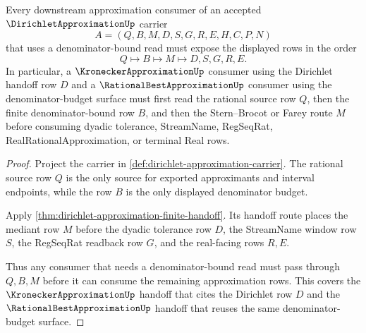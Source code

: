 \begin{theorem}
\label{thm:dirichlet-approximation-denominator-window}
Every downstream approximation consumer of an accepted $\DirichletApproximationUp$ carrier
$$
A=(Q,B,M,D,S,G,R,E,H,C,P,N)
$$
that uses a denominator-bound read must expose the displayed rows in the order
$$
Q \longmapsto B \longmapsto M \longmapsto D,S,G,R,E .
$$
In particular, a $\KroneckerApproximationUp$ consumer using the Dirichlet handoff row $D$ and a $\RationalBestApproximationUp$ consumer using the denominator-budget surface must first read the rational source row $Q$, then the finite denominator-bound row $B$, and then the Stern--Brocot or Farey route $M$ before consuming dyadic tolerance, StreamName, RegSeqRat, RealRationalApproximation, or terminal Real rows.
\end{theorem}
\begin{proof}
Project the carrier in \autoref{def:dirichlet-approximation-carrier}. The rational source row $Q$ is the only source for exported approximants and interval endpoints, while the row $B$ is the only displayed denominator budget.

Apply \autoref{thm:dirichlet-approximation-finite-handoff}. Its handoff route places the mediant row $M$ before the dyadic tolerance row $D$, the StreamName window row $S$, the RegSeqRat readback row $G$, and the real-facing rows $R,E$.

Thus any consumer that needs a denominator-bound read must pass through $Q,B,M$ before it can consume the remaining approximation rows. This covers the $\KroneckerApproximationUp$ handoff that cites the Dirichlet row $D$ and the $\RationalBestApproximationUp$ handoff that reuses the same denominator-budget surface.
\end{proof}


